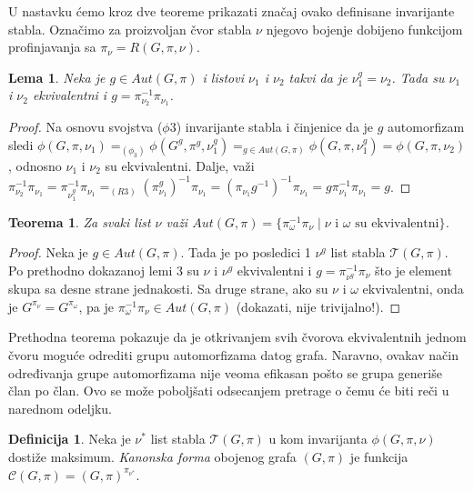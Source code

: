 \documentclass[12pt,oneside]{memoir}
\newtheorem{theorem}{Teorema}
\newtheorem{lemma}{Lema}
\theoremstyle{definition}
\newtheorem*{definition}{Definicija}
\begin{document}
  U nastavku ćemo kroz dve teoreme prikazati značaj ovako definisane
  invarijante stabla. Označimo za proizvoljan čvor stabla $\nu$ njegovo bojenje
  dobijeno funkcijom profinjavanja sa $\pi_\nu = R(G, \pi, \nu)$. 

  \begin{lemma}
	  Neka je $g \in Aut(G, \pi)$ i listovi $\nu_1$ i $\nu_2$ takvi da je
	  $\nu_1^g = \nu_2$. Tada su $\nu_1$ i $\nu_2$ ekvivalentni i $g =
	  \pi_{\nu_2}^{-1}\pi_{\nu_1}$.
  \end{lemma}

  \begin{proof}
	  Na osnovu svojstva ($\phi3$) invarijante stabla i činjenice da je $g$
	  automorfizam sledi $\phi(G, \pi, \nu_1) =_{(\phi_3)} \phi(G^g, \pi^g,
	  \nu_1^g) =_{g \in Aut(G, \pi)} \phi(G, \pi, \nu_1^g) = \phi(G, \pi,
	  \nu_2)$, odnosno $\nu_1$ i $\nu_2$ su ekvivalentni. Dalje, važi
	  $\pi_{\nu_2}^{-1}\pi_{\nu_1} = \pi_{\nu_1^g}^{-1}\pi_{\nu_1} =_{(R3)}
	  (\pi_{\nu_1}^g)^{-1}\pi_{\nu_1} = (\pi_{\nu_1} g^{-1})^{-1} \pi_{\nu_1} = g
	  \pi_{\nu_1}^{-1} \pi_{\nu_1} = g$.
  \end{proof}

  \begin{theorem}
	  Za svaki list $\nu$ važi $Aut(G, \pi) = \{\pi_{\omega}^{-1}\pi_{\nu}
	  \mid \text{$\nu$ i $\omega$ su ekvivalentni} \}$.
  \end{theorem}
  
  \begin{proof}
	  Neka je $g \in Aut(G, \pi)$. Tada je po posledici 1 $\nu^g$ list stabla
	  $\mathcal{T}(G, \pi)$. Po prethodno dokazanoj lemi 3 su $\nu$ i $\nu^g$
	  ekvivalentni i $g = \pi_{\nu^g}^{-1}\pi_\nu$ što je element skupa sa
	  desne strane jednakosti.  Sa druge strane, ako su $\nu$ i $\omega$
	  ekvivalentni, onda je $G^{\pi_\nu} = G^{\pi_\omega}$, pa je
	  $\pi_\omega^{-1}\pi_\nu \in Aut(G, \pi)$ {\color{red} (dokazati, nije trivijalno!)}.
  \end{proof}

	Prethodna teorema pokazuje da je otkrivanjem svih čvorova ekvivalentnih
	jednom čvoru moguće odrediti grupu automorfizama datog grafa. Naravno,
	ovakav način određivanja grupe automorfizama nije veoma efikasan pošto se
	grupa generiše član po član. Ovo se može poboljšati odsecanjem pretrage o
	čemu će biti reči u narednom odeljku.

  \begin{definition}
	  Neka je $\nu^*$ list stabla $\mathcal{T}(G, \pi)$ u kom invarijanta
	  $\phi(G, \pi, \nu)$ dostiže maksimum. \emph{Kanonska forma} obojenog
	  grafa $(G, \pi)$ je funkcija $\mathcal{C}(G, \pi) = (G,
	  \pi)^{\pi_{\nu^*}}$.
  \end{definition}
\end{document}
